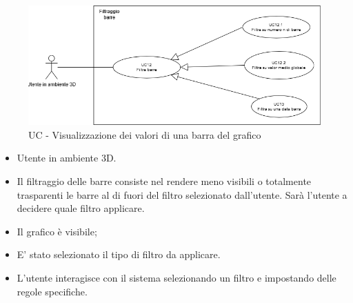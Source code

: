 \begin{figure}[h!]\centering
    \includegraphics[scale=0.7]{template/images/UC12.png}
    \caption{UC - Visualizzazione dei valori di una barra del grafico}
\end{figure}
\UCdsc
{ %
    \begin{itemize}
        \item Utente in ambiente 3D.
    \end{itemize}
}
{ %
    \begin{itemize}
        \item Il filtraggio delle barre consiste nel rendere meno visibili o totalmente trasparenti le barre al di fuori del filtro selezionato dall'utente.
                Sarà l'utente a decidere quale filtro applicare.
    \end{itemize}
}
{ %
    \begin{itemize}
        \item Il grafico è visibile;
    \end{itemize}
}
{ %
    \begin{itemize}
        \item E' stato selezionato il tipo di filtro da applicare.
    \end{itemize}
}
{ %
    \begin{itemize}
        \item L'utente interagisce con il sistema selezionando un filtro e impostando delle regole specifiche. 
    \end{itemize}
}

